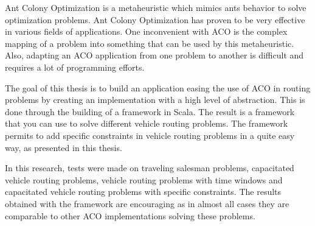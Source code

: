 Ant Colony Optimization is a metaheuristic which mimics ants behavior to solve optimization problems. Ant Colony Optimization has proven to be very effective in various fields of applications. One inconvenient with ACO is the complex mapping of a problem into something that can be used by this metaheuristic. Also, adapting an ACO application from one problem to another is difficult and requires a lot of programming efforts. 

The goal of this thesis is to build an application easing the use of ACO in routing problems by creating an implementation with a high level of abstraction. This is done through the building of a framework in Scala. The result is a framework that you can use to solve different vehicle routing problems. The framework permits to add specific constraints in vehicle routing problems in a quite easy way, as presented in this thesis.

In this research, tests were made on traveling salesman problems, capacitated vehicle routing problems, vehicle routing problems with time windows and capacitated vehicle routing problems with specific constraints. The results obtained with the framework are encouraging as in almost all cases they are comparable to other ACO implementations solving these problems.